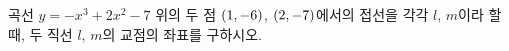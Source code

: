 곡선 $y=-x^3+2x^2-7$ 위의 두 점 $(1{,}\mkern3mu\mathopen{}-6)$, $(2{,}\mkern3mu\mathopen{}-7)$에서의 접선을 각각 $l$, $m$이라 할 때, 두 직선 $l$, $m$의 교점의 좌표를 구하시오.
